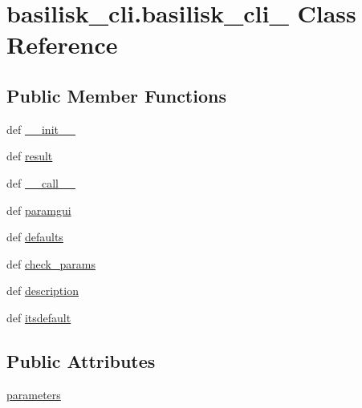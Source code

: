 \hypertarget{classbasilisk__cli_1_1basilisk__cli__}{\section{basilisk\-\_\-cli.\-basilisk\-\_\-cli\-\_\- \-Class \-Reference}
\label{classbasilisk__cli_1_1basilisk__cli__}
}
\subsection*{\-Public \-Member \-Functions}
\begin{DoxyCompactItemize}
\item 
def \hyperlink{classbasilisk__cli_1_1basilisk__cli___afcee075597b63cd6b6ab350bc48b8bfa}{\-\_\-\-\_\-init\-\_\-\-\_\-}
\item 
def \hyperlink{classbasilisk__cli_1_1basilisk__cli___abc481ebd54c6f70ec9fc7ddf268b2329}{result}
\item 
def \hyperlink{classbasilisk__cli_1_1basilisk__cli___a65b43f35d5ae633cd6b0d92d71c6fd7c}{\-\_\-\-\_\-call\-\_\-\-\_\-}
\item 
def \hyperlink{classbasilisk__cli_1_1basilisk__cli___a83031f0c89cd410f81f9321e54e60760}{paramgui}
\item 
def \hyperlink{classbasilisk__cli_1_1basilisk__cli___a64cfad389b4e9b560a9a493c944410a2}{defaults}
\item 
def \hyperlink{classbasilisk__cli_1_1basilisk__cli___ae6e78560d239b7977f97fb8b15e431c3}{check\-\_\-params}
\item 
def \hyperlink{classbasilisk__cli_1_1basilisk__cli___a9437a30483b3d63ba553cfc0d6273265}{description}
\item 
def \hyperlink{classbasilisk__cli_1_1basilisk__cli___a6262f76126f6c161f940179a130248e7}{itsdefault}
\end{DoxyCompactItemize}
\subsection*{\-Public \-Attributes}
\begin{DoxyCompactItemize}
\item 
\hyperlink{classbasilisk__cli_1_1basilisk__cli___aa59e8e28e478ed8ef7353cb0b055786b}{parameters}
\end{DoxyCompactItemize}
